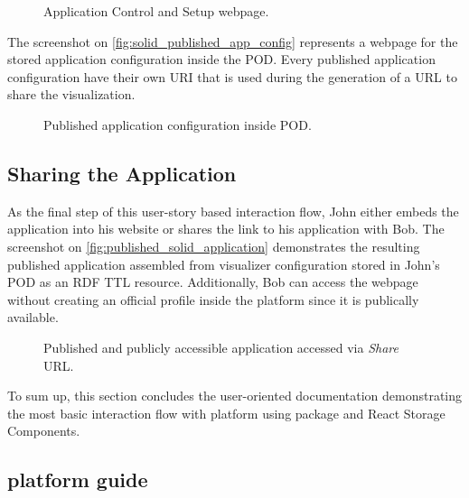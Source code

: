 \begin{figure}[h]
\centering
{}
\caption{Application Control and Setup webpage.}
\label{fig:create_application_screen}
\end{figure}

The screenshot on \autoref{fig:solid_published_app_config} represents a webpage for the stored application configuration inside the \solid{} POD. Every published application configuration have their own URI that is used during the generation of a URL to share the visualization.

\begin{figure}[h]
\centering
{}
\caption{Published application configuration inside \solid{} POD.}
\label{fig:solid_published_app_config}
\end{figure}

\subsection{Sharing the Application}

As the final step of this user-story based interaction flow, John either embeds the application into his website or shares the link to his application with Bob. The screenshot on \autoref{fig:published_solid_application} demonstrates the resulting published application assembled from visualizer configuration stored in John's \solid{} POD as an RDF TTL resource. Additionally, Bob can access the webpage without creating an official profile inside the \lpa{} platform since it is publically available. 

\begin{figure}[h]
\centering
{}
\caption{Published and publicly accessible application accessed via \textit{Share} URL.}
\label{fig:published_solid_application}
\end{figure}

To sum up, this section concludes the user-oriented documentation demonstrating the most basic interaction flow with \lpa{} platform using \lpas{} package and React Storage Components. 

\subsection{\lpa{} platform guide}

